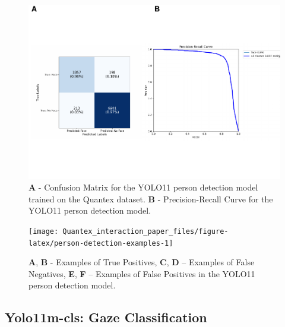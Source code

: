 \documentclass[
  man,floatsintext]{apa6}
\begin{document}
\begin{figure}

{\centering \includegraphics{Quantex_interaction_paper_files/figure-latex/person-metrics-1} 

}

\caption{\textbf{A} - Confusion Matrix for the YOLO11 person detection model trained on the Quantex dataset. \textbf{B} - Precision-Recall Curve for the YOLO11 person detection model.}\label{fig:person-metrics}
\end{figure}

\begin{figure}

{\centering \texttt{[image: Quantex\_interaction\_paper\_files/figure-latex/person-detection-examples-1]} 

}

\caption{\textbf{A}, \textbf{B} - Examples of True Positives, \textbf{C}, \textbf{D} – Examples of False Negatives, \textbf{E}, \textbf{F} – Examples of False Positives in the YOLO11 person detection model.}\label{fig:person-detection-examples}
\end{figure}

\subsection{Yolo11m-cls: Gaze Classification}\label{yolo11m-cls-gaze-classification}
\end{document}
